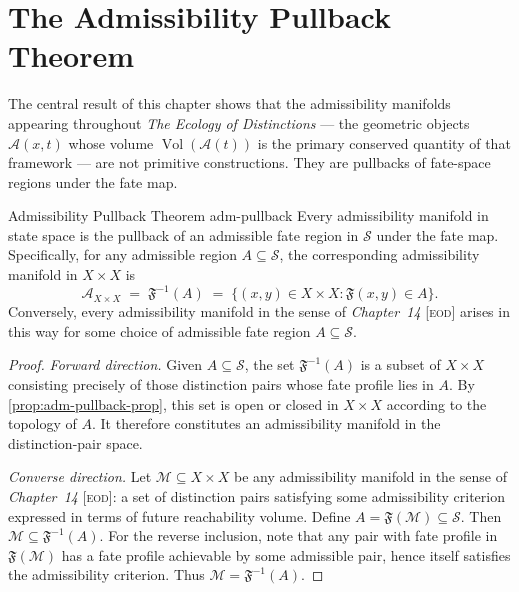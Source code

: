 \documentclass[12pt,twoside,openright]{book}
\newcommand{\adm}{\mathcal{A}}            %
\newcommand{\Vol}{\operatorname{Vol}}     %
\newcommand{\distPairs}{X\times X}
\newcommand{\fateMap}{\mathfrak{F}}
\newcommand{\fateSpace}{\mathcal{S}}
\newcommand{\EOD}[1]{\textit{#1} [\textsc{eod}]}
\newcommand{\admRegion}{A}
\providecommand{\admRegion}{A}
\begin{document}
\section{The Admissibility Pullback Theorem}

The central result of this chapter shows that the admissibility
manifolds appearing throughout \textit{The Ecology of
Distinctions} --- the geometric objects
$\adm(x,t)$ whose volume $\Vol(\adm(t))$ is the primary
conserved quantity of that framework --- are not primitive
constructions. They are pullbacks of fate-space regions under
the fate map.

\begin{metatheorem}{Admissibility Pullback Theorem}%
  {adm-pullback}
Every admissibility manifold in state space is the pullback of
an admissible fate region in $\fateSpace$ under the fate map.
Specifically, for any admissible region $\admRegion\subseteq\fateSpace$,
the corresponding admissibility manifold in $\distPairs$ is
\[
  \adm_{\distPairs}
  \;=\;
  \fateMap^{-1}(\admRegion)
  \;=\;
  \bigl\{(x,y)\in\distPairs
    : \fateMap(x,y)\in\admRegion\bigr\}.
\]
Conversely, every admissibility manifold in the sense of
\EOD{Chapter~14} arises in this way for some choice of
admissible fate region $\admRegion\subseteq\fateSpace$.
\begin{proof}
\emph{Forward direction.} Given $\admRegion\subseteq\fateSpace$,
the set $\fateMap^{-1}(\admRegion)$ is a subset of $\distPairs$
consisting precisely of those distinction pairs whose fate
profile lies in $\admRegion$. By
\cref{prop:adm-pullback-prop}, this set is open or closed in
$\distPairs$ according to the topology of $\admRegion$.
It therefore constitutes an admissibility manifold in the
distinction-pair space.

\emph{Converse direction.} Let $\mathcal{M}\subseteq\distPairs$
be any admissibility manifold in the sense of \EOD{Chapter~14}:
a set of distinction pairs satisfying some admissibility
criterion expressed in terms of future reachability volume.
Define $\admRegion = \fateMap(\mathcal{M})\subseteq\fateSpace$.
Then $\mathcal{M}\subseteq\fateMap^{-1}(\admRegion)$.
For the reverse inclusion, note that any pair with fate profile
in $\fateMap(\mathcal{M})$ has a fate profile achievable by
some admissible pair, hence itself satisfies the admissibility
criterion. Thus $\mathcal{M}=\fateMap^{-1}(\admRegion)$.
\end{proof}
\end{metatheorem}
\end{document}
